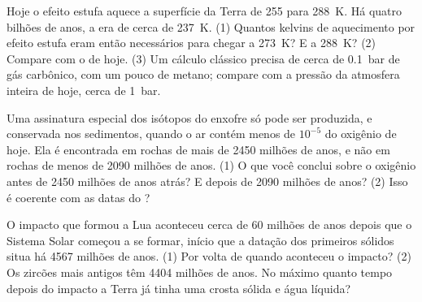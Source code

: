 \begin{exercise}[$\star\star\star$]\label{exo:g12:early-earth:13}
Hoje o efeito estufa aquece a superfície da Terra de 255 para
\qty{288}{K}. Há quatro bilhões de anos, a  era de
cerca de \qty{237}{K}. (1) Quantos kelvins de aquecimento por efeito estufa
eram então necessários para chegar a \qty{273}{K}? E a \qty{288}{K}?
(2) Compare com o de hoje. (3) Um cálculo clássico precisa de cerca de
\qty{0.1}{bar} de gás carbônico, com um pouco de metano; compare com a
pressão da atmosfera inteira de hoje, cerca de \qty{1}{bar}.
\end{exercise}

\begin{exercise}[$\star\star\star$]\label{exo:g12:early-earth:14}
Uma assinatura especial dos isótopos do enxofre só pode ser produzida, e
conservada nos sedimentos, quando o ar contém menos de $10^{-5}$ do oxigênio
de hoje. Ela é encontrada em rochas de mais de 2450 milhões de anos, e não em
rochas de menos de 2090 milhões de anos. (1) O que você conclui sobre o
oxigênio antes de 2450 milhões de anos atrás? E depois de 2090 milhões de
anos? (2) Isso é coerente com as datas do ?
\end{exercise}

\begin{exercise}[$\star\star\star$]\label{exo:g12:early-earth:15}
O impacto que formou a Lua aconteceu cerca de 60 milhões de anos depois que
o Sistema Solar começou a se formar, início que a datação dos primeiros
sólidos situa há 4567 milhões de anos. (1) Por volta de quando aconteceu o impacto?
(2) Os zircões mais antigos têm \num{4404} milhões de anos. No máximo quanto
tempo depois do impacto a Terra já tinha uma crosta sólida e água líquida?
\end{exercise}

